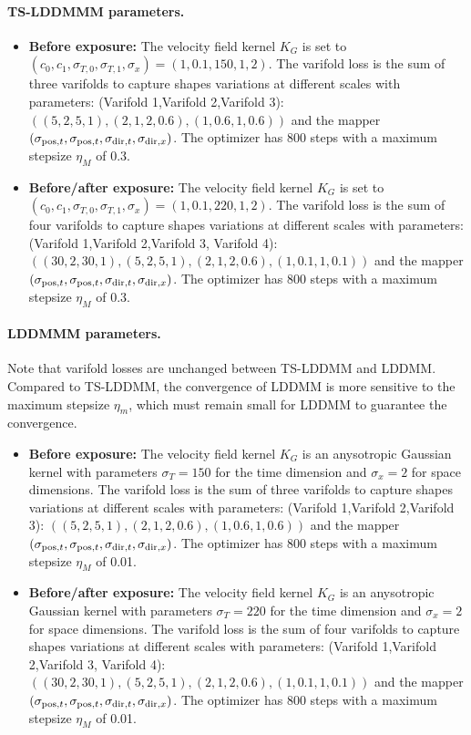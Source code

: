 \paragraph{TS-LDDMMM parameters.}
\begin{itemize}
  \item \textbf{Before exposure:} The velocity field kernel $K_G$ is set to $ (c_0,c_1,\sigma_{T,0},\sigma_{T,1},\sigma_x) = (1,0.1,150,1,2)$. The varifold loss is the sum of three varifolds to capture shapes variations at different scales with parameters: (Varifold 1,Varifold 2,Varifold 3): $\left((5,2,5,1),(2,1,2,0.6),(1,0.6,1,0.6)\right)$ and the mapper $(\sigma_{\mathrm{pos},t}, \sigma_{\mathrm{pos},t}, \sigma_{\mathrm{dir},t}, \sigma_{\mathrm{dir},x})$. The optimizer has 800 steps with a maximum stepsize $\eta_M$ of 0.3.
  \item \textbf{Before/after exposure:} The velocity field kernel $K_G$ is set to $ (c_0,c_1,\sigma_{T,0},\sigma_{T,1},\sigma_x) = (1,0.1,220,1,2)$. The varifold loss is the sum of four varifolds to capture shapes variations at different scales with parameters: (Varifold 1,Varifold 2,Varifold 3, Varifold 4): $\left((30,2,30,1),(5,2,5,1),(2,1,2,0.6),(1,0.1,1,0.1)\right)$ and the mapper $(\sigma_{\mathrm{pos},t}, \sigma_{\mathrm{pos},t}, \sigma_{\mathrm{dir},t}, \sigma_{\mathrm{dir},x})$. The optimizer has 800 steps with a maximum stepsize $\eta_M$ of 0.3.
\end{itemize}

\paragraph{LDDMMM parameters.} Note that varifold losses are unchanged between TS-LDDMM and LDDMM. Compared to TS-LDDMM, the convergence of LDDMM is more sensitive to the maximum stepsize $\eta_m$, which must remain small for LDDMM to guarantee the convergence.
\begin{itemize}
  \item \textbf{Before exposure:} The velocity field kernel $K_G$ is an anysotropic Gaussian kernel with parameters $\sigma_{T} =150$ for the time dimension and $\sigma_x = 2$ for space dimensions. 
  The varifold loss is the sum of three varifolds to capture shapes variations at different scales with parameters: (Varifold 1,Varifold 2,Varifold 3): $\left((5,2,5,1),(2,1,2,0.6),(1,0.6,1,0.6)\right)$ and the mapper $(\sigma_{\mathrm{pos},t}, \sigma_{\mathrm{pos},t}, \sigma_{\mathrm{dir},t}, \sigma_{\mathrm{dir},x})$. The optimizer has 800 steps with a maximum stepsize $\eta_M$ of 0.01.
  \item \textbf{Before/after exposure:} The velocity field kernel $K_G$ is an anysotropic Gaussian kernel with parameters $\sigma_{T} =220$ for the time dimension and $\sigma_x = 2$ for space dimensions.
  The varifold loss is the sum of four varifolds to capture shapes variations at different scales with parameters: (Varifold 1,Varifold 2,Varifold 3, Varifold 4): $\left((30,2,30,1),(5,2,5,1),(2,1,2,0.6),(1,0.1,1,0.1)\right)$ and the mapper $(\sigma_{\mathrm{pos},t}, \sigma_{\mathrm{pos},t}, \sigma_{\mathrm{dir},t}, \sigma_{\mathrm{dir},x})$. The optimizer has 800 steps with a maximum stepsize $\eta_M$ of 0.01.
\end{itemize}

